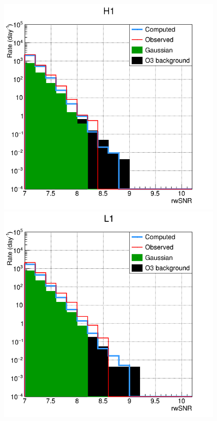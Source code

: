 \begin{figure}
  \centering
  \begin{minipage}{0.45\linewidth}
    \includegraphics[width=\linewidth]{sectionFAR/O4/cComputedH1.png}
  \end{minipage}
  \begin{minipage}{0.45\linewidth}
    \includegraphics[width=\linewidth]{sectionFAR/O4/cComputedL1.png}

\end{minipage}
\end{figure}
